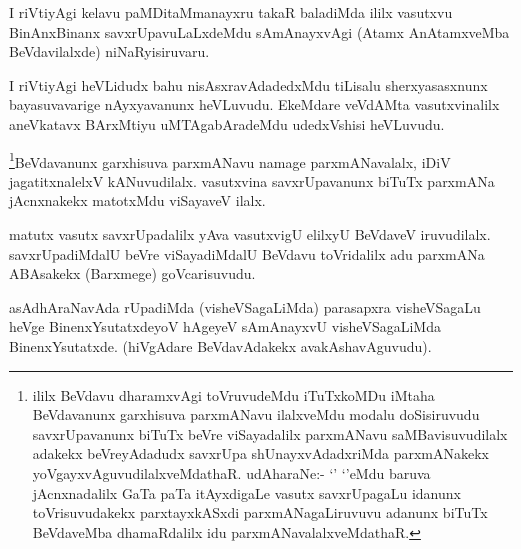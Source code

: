 
\begin{artha}
I riVtiyAgi kelavu paMDitaMmanayxru takaR baladiMda ililx vasutxvu BinAnxBinanx savxrUpavuLaLxdeMdu sAmAnayxvAgi (Atamx AnAtamxveMba BeVdavilalxde) niNaRyisiruvaru.
\end{artha}


\begin{artha}
I riVtiyAgi heVLidudx bahu nisAsxravAdadedxMdu tiLisalu sherxyasasxnunx bayasuvavarige nAyxyavanunx heVLuvudu. EkeMdare veVdAMta vasutxvinalilx aneVkatavx BArxMtiyu uMTAgabAradeMdu udedxVshisi heVLuvudu.
\end{artha}

\begin{artha}
\footnote{ililx BeVdavu dharamxvAgi toVruvudeMdu iTuTxkoMDu iMtaha BeVdavanunx garxhisuva parxmANavu ilalxveMdu modalu doSisiruvudu savxrUpavanunx biTuTx beVre viSayadalilx parxmANavu saMBavisuvudilalx adakekx beVreyAdadudx savxrUpa shUnayxvAdadxriMda parxmANakekx yoVgayxvAguvudilalxveMdathaR. udAharaNe:- `\stext' `\stext'eMdu baruva jAcnxnadalilx GaTa paTa itAyxdigaLe vasutx savxrUpagaLu idanunx toVrisuvudakekx parxtayxkASxdi parxmANagaLiruvuvu adanunx biTuTx BeVdaveMba dhamaRdalilx idu parxmANavalalxveMdathaR.}BeVdavanunx garxhisuva parxmANavu namage parxmANavalalx, iDiV jagatitxnalelxV kANuvudilalx. vasutxvina savxrUpavanunx biTuTx parxmANa jAcnxnakekx matotxMdu viSayaveV ilalx.
\end{artha}


\begin{artha}
matutx vasutx savxrUpadalilx yAva vasutxvigU elilxyU BeVdaveV iruvudilalx. savxrUpadiMdalU beVre viSayadiMdalU BeVdavu toVridalilx adu parxmANa ABAsakekx (Barxmege) goVcarisuvudu.
\end{artha}


\begin{artha}
asAdhAraNavAda rUpadiMda (visheVSagaLiMda) parasapxra visheVSagaLu heVge BinenxYsutatxdeyoV hAgeyeV sAmAnayxvU visheVSagaLiMda BinenxYsutatxde. (hiVgAdare BeVdavAdakekx avakAshavAguvudu).
\end{artha}



